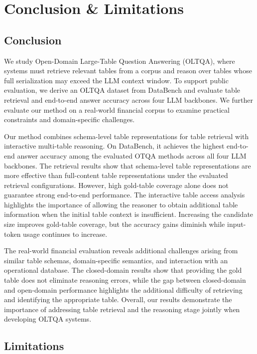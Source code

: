 \chapter{Conclusion \& Limitations}
\label{sec:conclusion}

\section{Conclusion}

We study Open-Domain Large-Table Question Answering (OLTQA), where systems must retrieve relevant tables from a corpus and reason over tables whose full serialization may exceed the LLM context window.
To support public evaluation, we derive an OLTQA dataset from DataBench and evaluate table retrieval and end-to-end answer accuracy across four LLM backbones.
We further evaluate our method on a real-world financial corpus to examine practical constraints and domain-specific challenges.

Our method combines schema-level table representations for table retrieval with interactive multi-table reasoning.
On DataBench, it achieves the highest end-to-end answer accuracy among the evaluated OTQA methods across all four LLM backbones.
The retrieval results show that schema-level table representations are more effective than full-content table representations under the evaluated retrieval configurations.
However, high gold-table coverage alone does not guarantee strong end-to-end performance.
The interactive table access analysis highlights the importance of allowing the reasoner to obtain additional table information when the initial table context is insufficient.
Increasing the candidate size improves gold-table coverage, but the accuracy gains diminish while input-token usage continues to increase.

The real-world financial evaluation reveals additional challenges arising from similar table schemas, domain-specific semantics, and interaction with an operational database.
The closed-domain results show that providing the gold table does not eliminate reasoning errors, while the gap between closed-domain and open-domain performance highlights the additional difficulty of retrieving and identifying the appropriate table.
Overall, our results demonstrate the importance of addressing table retrieval and the reasoning stage jointly when developing OLTQA systems.

\section{Limitations}

